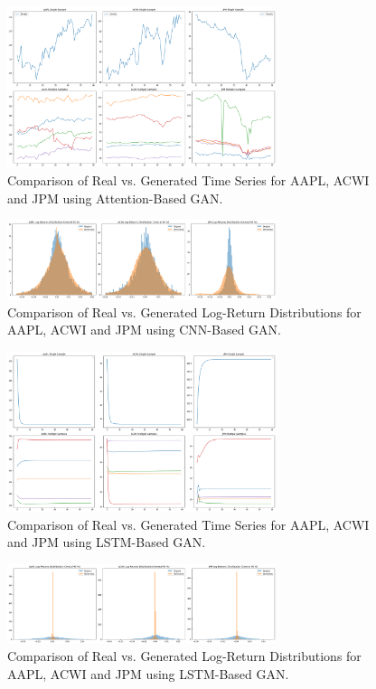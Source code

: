 \documentclass{article}
\begin{document}
\begin{figure}[h!]
    \centering
    \includegraphics[width=0.7\textwidth]{CNN_gen_samples}
    \caption{Comparison of Real vs. Generated Time Series for AAPL, ACWI and JPM using Attention-Based GAN.}
    \label{fig:attention_comparison}
\end{figure}

\begin{figure}[h!]
    \centering
    \includegraphics[width=0.7\textwidth]{cnn_distributions}
    \caption{Comparison of Real vs. Generated Log-Return Distributions for AAPL, ACWI and JPM using CNN-Based GAN.}
    \label{fig:attention_comparison}
\end{figure}

\begin{figure}[h!]
    \centering
    \includegraphics[width=0.7\textwidth]{LSTM_gen_samples}
    \caption{Comparison of Real vs. Generated Time Series for AAPL, ACWI and JPM using LSTM-Based GAN.}
    \label{fig:attention_comparison}
\end{figure}

\begin{figure}[h!]
    \centering
    \includegraphics[width=0.7\textwidth]{LSTM_distributions}
    \caption{Comparison of Real vs. Generated Log-Return Distributions for AAPL, ACWI and JPM using LSTM-Based GAN.}
    \label{fig:attention_comparison}
\end{figure}
\end{document}
